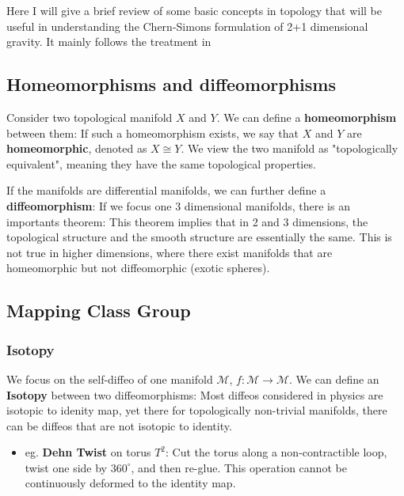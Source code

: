 Here I will give a brief review of some basic concepts in topology that will be useful in understanding the Chern-Simons formulation of 2+1 dimensional gravity. It mainly follows the treatment in \cite{Carlip:1998qg}


\subsection{Homeomorphisms and diffeomorphisms}

Consider two topological manifold \(X\) and \(Y\). We can define a \textbf{homeomorphism} between them:
If such a homeomorphism exists, we say that \(X\) and \(Y\) are \textbf{homeomorphic}, denoted as \(X \cong Y\). We view the two manifold as "topologically equivalent", meaning they have the same topological properties. 

If the manifolds are differential manifolds, we can further define a \textbf{diffeomorphism}:
If we focus one 3 dimensional manifolds, there is an importants theorem:
This theorem implies that in 2 and 3 dimensions, the topological structure and the smooth structure are essentially the same. This is not true in higher dimensions, where there exist manifolds that are homeomorphic but not diffeomorphic (exotic spheres).

\subsection{Mapping Class Group}

\subsubsection{Isotopy}

We focus on the self-diffeo of one manifold $ \mathcal{M} $, $ f: \mathcal{M} \to \mathcal{M} $. We can define an \textbf{Isotopy} between two diffeomorphisms:
Most diffeos considered in physics are isotopic to idenity map, yet there for topologically non-trivial manifolds, there can be diffeos that are not isotopic to identity. 
\begin{itemize}
  \item eg. \textbf{Dehn Twist} on torus \(T^2\): Cut the torus along a non-contractible loop, twist one side by \(360^\circ\), and then re-glue. This operation cannot be continuously deformed to the identity map.
\end{itemize}


